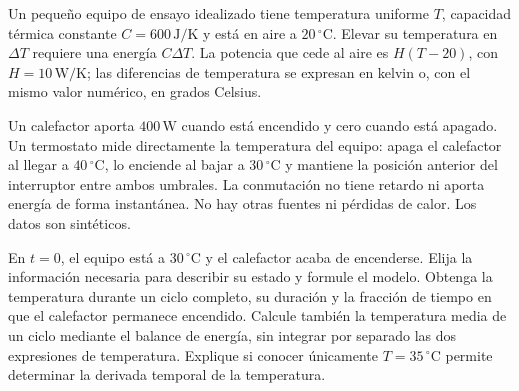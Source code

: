Un pequeño equipo de ensayo idealizado tiene temperatura uniforme \(T\), capacidad térmica constante \(C=600\,\mathrm{J/K}\) y está en aire a \(20\,{}^\circ\mathrm C\). Elevar su temperatura en \(\Delta T\) requiere una energía \(C\Delta T\). La potencia que cede al aire es \(H(T-20)\), con \(H=10\,\mathrm{W/K}\); las diferencias de temperatura se expresan en kelvin o, con el mismo valor numérico, en grados Celsius.

Un calefactor aporta \(400\,\mathrm W\) cuando está encendido y cero cuando está apagado. Un termostato mide directamente la temperatura del equipo: apaga el calefactor al llegar a \(40\,{}^\circ\mathrm C\), lo enciende al bajar a \(30\,{}^\circ\mathrm C\) y mantiene la posición anterior del interruptor entre ambos umbrales. La conmutación no tiene retardo ni aporta energía de forma instantánea. No hay otras fuentes ni pérdidas de calor. Los datos son sintéticos.

En \(t=0\), el equipo está a \(30\,{}^\circ\mathrm C\) y el calefactor acaba de encenderse. Elija la información necesaria para describir su estado y formule el modelo. Obtenga la temperatura durante un ciclo completo, su duración y la fracción de tiempo en que el calefactor permanece encendido. Calcule también la temperatura media de un ciclo mediante el balance de energía, sin integrar por separado las dos expresiones de temperatura. Explique si conocer únicamente \(T=35\,{}^\circ\mathrm C\) permite determinar la derivada temporal de la temperatura.

